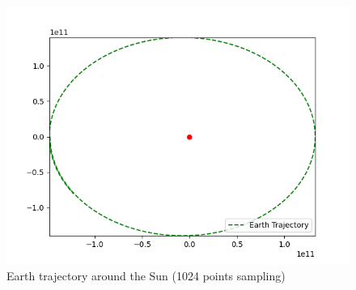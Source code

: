 \begin{figure}
    \center
    \includegraphics[scale=.5]{img/earth_trajectory_test.png}
    \caption{Earth trajectory around the Sun (1024 points sampling)}
    \label{earth_traj}
\end{figure}